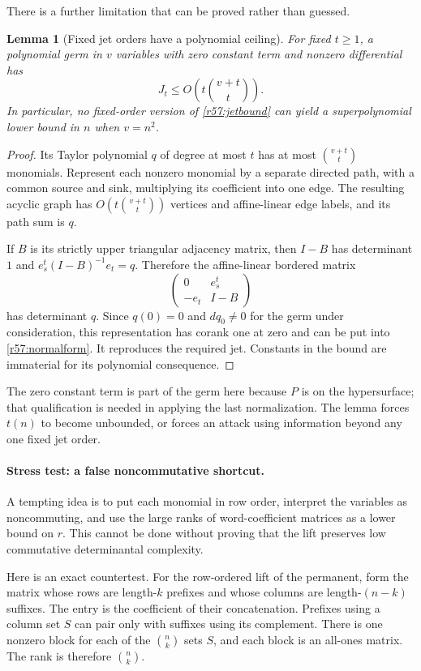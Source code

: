 \documentclass[11pt,a4paper]{article}
\newtheorem{notebooklemma}{Lemma}[section]
\numberwithin{equation}{section}
\begin{document}
There is a further limitation that can be proved rather than guessed.
\begin{notebooklemma}[Fixed jet orders have a polynomial ceiling]\label{r57:fixedorder}
For fixed $t\geq1$, a polynomial germ in $v$ variables with zero constant term and nonzero differential has
\[
 J_t\leq O\!\left(t\binom{v+t}{t}\right).
\]
In particular, no fixed-order version of \eqref{r57:jetbound} can yield a superpolynomial lower bound in $n$ when $v=n^2$.
\end{notebooklemma}
\begin{proof}
Its Taylor polynomial $q$ of degree at most $t$ has at most $\binom{v+t}{t}$ monomials. Represent each nonzero monomial by a separate directed path, with a common source and sink, multiplying its coefficient into one edge. The resulting acyclic graph has $O(t\binom{v+t}{t})$ vertices and affine-linear edge labels, and its path sum is $q$.

If $B$ is its strictly upper triangular adjacency matrix, then $I-B$ has determinant $1$ and
$e_s^t(I-B)^{-1}e_t=q$. Therefore the affine-linear bordered matrix
\[
 \begin{pmatrix}0&e_s^t\\-e_t&I-B\end{pmatrix}
\]
has determinant $q$. Since $q(0)=0$ and $dq_0\ne0$ for the germ under consideration, this representation has corank one at zero and can be put into \eqref{r57:normalform}. It reproduces the required jet. Constants in the bound are immaterial for its polynomial consequence.
\end{proof}
The zero constant term is part of the germ here because $P$ is on the hypersurface; that qualification is needed in applying the last normalization. The lemma forces $t(n)$ to become unbounded, or forces an attack using information beyond any one fixed jet order.

\paragraph{Stress test: a false noncommutative shortcut.}
A tempting idea is to put each monomial in row order, interpret the variables as noncommuting, and use the large ranks of word-coefficient matrices as a lower bound on $r$. This cannot be done without proving that the lift preserves low commutative determinantal complexity.

Here is an exact countertest. For the row-ordered lift of the permanent, form the matrix whose rows are length-$k$ prefixes and whose columns are length-$(n-k)$ suffixes. The entry is the coefficient of their concatenation. Prefixes using a column set $S$ can pair only with suffixes using its complement. There is one nonzero block for each of the $\binom nk$ sets $S$, and each block is an all-ones matrix. The rank is therefore $\binom nk$.
\end{document}
